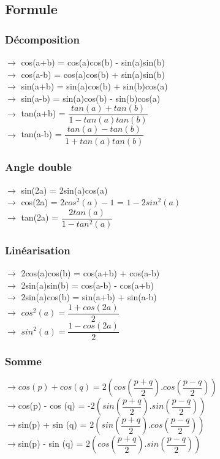 \documentclass[9pt]{article}
\begin{document}
\begin{multicols*}{2}
\part*{Formule}
\section{Décomposition}
$\rightarrow$ cos(a+b) = cos(a)cos(b) - sin(a)sin(b)\\
$\rightarrow$ cos(a-b) = cos(a)cos(b) + sin(a)sin(b)\\
$\rightarrow$ sin(a+b) = sin(a)cos(b) + sin(b)cos(a)\\
$\rightarrow$ sin(a-b) = sin(a)cos(b) - sin(b)cos(a)\\
$\rightarrow$ tan(a+b) = $\dfrac{tan(a) + tan(b)}{1 - tan(a)tan(b)}$\\
$\rightarrow$ tan(a-b) = $\dfrac{tan(a) - tan(b)}{1 + tan(a)tan(b)}$

\section{Angle double}
$\rightarrow$ sin(2a) = 2sin(a)cos(a)\\
$\rightarrow$ cos(2a) = $2cos^2(a)-1$ = $1 - 2sin^2(a)$\\
$\rightarrow$ tan(2a) = $\dfrac{2tan(a)}{1-tan^2(a)}$
\section{Linéarisation}
$\rightarrow$ 2cos(a)cos(b) = cos(a+b) + cos(a-b)\\
$\rightarrow$ 2sin(a)sin(b) = cos(a-b) - cos(a+b)\\
$\rightarrow$ 2sin(a)cos(b) = sin(a+b) + sin(a-b)\\
$\rightarrow$ $cos^2(a) = \dfrac{1+cos(2a)}{2}$\\
$\rightarrow$ $sin^2(a) = \dfrac{1-cos(2a)}{2}$
\section{Somme}
$\rightarrow cos(p) + cos (q) = 2(cos(\dfrac{p+q}{2}).cos(\dfrac{p-q}{2}))$ \\
$\rightarrow$cos(p) - cos (q) = -$2(sin(\dfrac{p+q}{2}).sin(\dfrac{p-q}{2}))$\\
$\rightarrow$sin(p) + sin (q) = $2(sin(\dfrac{p+q}{2}).cos(\dfrac{p-q}{2}))$\\
$\rightarrow$sin(p) - sin (q) = $2(cos(\dfrac{p+q}{2}).sin(\dfrac{p-q}{2}))$

\end{multicols*}
\end{document}
